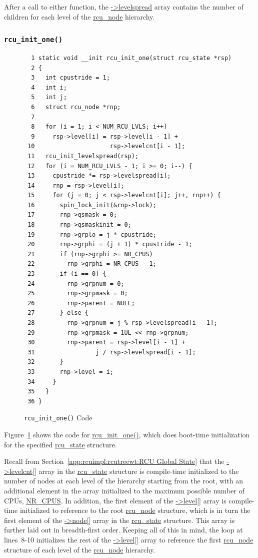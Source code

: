 After a call to either function, the \url{->levelspread} array contains
the number of children for each level of the \url{rcu_node} hierarchy.

\subsubsection{\tt rcu\_init\_one()}
\label{app:rcuimpl:rcutreewt:rcu-init-one}

\begin{figure}[tbp]
{ \scriptsize
\begin{verbatim}
  1 static void __init rcu_init_one(struct rcu_state *rsp)
  2 {
  3   int cpustride = 1;
  4   int i;
  5   int j;
  6   struct rcu_node *rnp;
  7 
  8   for (i = 1; i < NUM_RCU_LVLS; i++)
  9     rsp->level[i] = rsp->level[i - 1] +
 10                     rsp->levelcnt[i - 1];
 11   rcu_init_levelspread(rsp);
 12   for (i = NUM_RCU_LVLS - 1; i >= 0; i--) {
 13     cpustride *= rsp->levelspread[i];
 14     rnp = rsp->level[i];
 15     for (j = 0; j < rsp->levelcnt[i]; j++, rnp++) {
 16       spin_lock_init(&rnp->lock);
 17       rnp->qsmask = 0;
 18       rnp->qsmaskinit = 0;
 19       rnp->grplo = j * cpustride;
 20       rnp->grphi = (j + 1) * cpustride - 1;
 21       if (rnp->grphi >= NR_CPUS)
 22         rnp->grphi = NR_CPUS - 1;
 23       if (i == 0) {
 24         rnp->grpnum = 0;
 25         rnp->grpmask = 0;
 26         rnp->parent = NULL;
 27       } else {
 28         rnp->grpnum = j % rsp->levelspread[i - 1];
 29         rnp->grpmask = 1UL << rnp->grpnum;
 30         rnp->parent = rsp->level[i - 1] +
 31                 j / rsp->levelspread[i - 1];
 32       }
 33       rnp->level = i;
 34     }
 35   }
 36 }
\end{verbatim}
}
\caption{{\tt rcu\_init\_one()} Code}
\label{fig:app:rcuimpl:rcutreewt:Code for rcu-init-one}
\end{figure}

Figure~\ref{fig:app:rcuimpl:rcutreewt:Code for rcu-init-one}
shows the code for \url{rcu_init_one()}, which does boot-time initialization
for the specified 
\url{rcu_state} structure.

Recall from
Section~\ref{app:rcuimpl:rcutreewt:RCU Global State}
that the \url{->levelcnt[]} array in the \url{rcu_state} structure
is compile-time initialized to the number of nodes at each level of
the hierarchy starting from the root,
with an additional element in the array initialized
to the maximum possible number of CPUs, \url{NR_CPUS}.
In addition, the first element of the \url{->level[]} array is compile-time
initialized to reference to the root \url{rcu_node} structure, which is
in turn
the first element of the \url{->node[]} array in the \url{rcu_state} structure.
This array is further laid out in breadth-first order.
Keeping all of this in mind, the loop at lines~8-10 initializes the rest
of the \url{->level[]} array to reference the first \url{rcu_node} structure
of each level of the \url{rcu_node} hierarchy.

